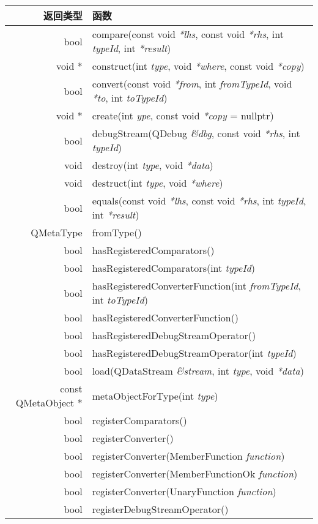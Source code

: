 \begin{longtable}{|r|m{28em}|}   
\hline
返回类型 	& 函数 \\
\hline
bool	& compare(const void \emph{*lhs}, const void \emph{*rhs}, int \emph{typeId}, int \emph{*result})\\
\hline
void *	&construct(int \emph{type}, void \emph{*where}, const void \emph{*copy})\\
\hline
bool	& convert(const void \emph{*from}, int \emph{fromTypeId}, void \emph{*to}, int \emph{toTypeId})\\
\hline
void *	& create(int \emph{ype}, const void \emph{*copy} = nullptr)\\
\hline
bool	& debugStream(QDebug \emph{\&dbg}, const void \emph{*rhs}, int \emph{typeId})\\
\hline
void	& destroy(int \emph{type}, void \emph{*data})\\
\hline
void	& destruct(int \emph{type}, void \emph{*where})\\
\hline
bool	&equals(const void \emph{*lhs}, const void \emph{*rhs}, int \emph{typeId}, int \emph{*result})\\
\hline
QMetaType&	fromType()\\
\hline
bool	& hasRegisteredComparators()\\
\hline
bool	& hasRegisteredComparators(int \emph{typeId})\\
\hline
bool	&hasRegisteredConverterFunction(int \emph{fromTypeId}, int \emph{toTypeId})\\
\hline
bool	&hasRegisteredConverterFunction()\\
\hline
bool	&hasRegisteredDebugStreamOperator()\\
\hline
bool	&hasRegisteredDebugStreamOperator(int \emph{typeId})\\
\hline
bool	&load(QDataStream  \emph{\&stream}, int  \emph{type}, void \emph{*data})\\
\hline
const QMetaObject *&	metaObjectForType(int \emph{type})\\
\hline
bool&	registerComparators()\\
\hline
bool&	registerConverter()\\
\hline
bool&	registerConverter(MemberFunction \emph{function})\\
\hline
bool&	registerConverter(MemberFunctionOk \emph{function})\\
\hline
bool&	registerConverter(UnaryFunction \emph{function})\\
\hline
bool&	registerDebugStreamOperator()\\

\end{longtable}

